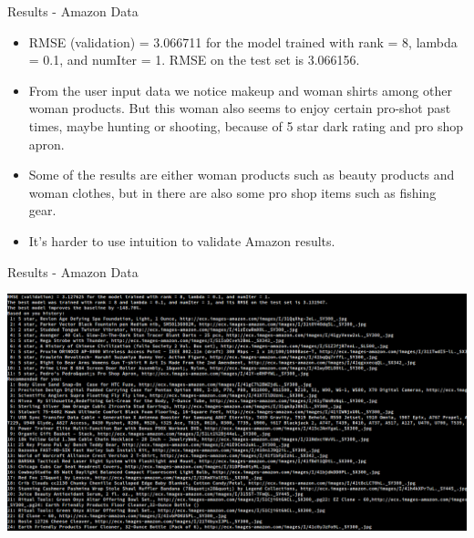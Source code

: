\documentclass{beamer}
\begin{document}

\begin{frame}{Results - Amazon Data}{}

  \begin{itemize}
      \item {
        RMSE (validation) = 3.066711 for the model trained with rank = 8, lambda = 0.1, and numIter = 1.
        RMSE on the test set is 3.066156.
      }
      \item {
        From the user input data we notice makeup and woman shirts among other woman products.  But this woman also seems to enjoy certain pro-shot past times, maybe hunting or shooting, because of 5 star dark rating and pro shop apron.
      }
      \item {
        Some of the results are either woman products such as beauty products and woman clothes, but in there are also some pro shop items such as fishing gear.
      }
      \item {
        It's harder to use intuition to validate Amazon results.
      }
  \end{itemize}
  
\end{frame}


\begin{frame}{Results - Amazon Data}{}

      \includegraphics[width=1.5\textwidth]{image/amazon_results_crop}
  
\end{frame}
\end{document}
